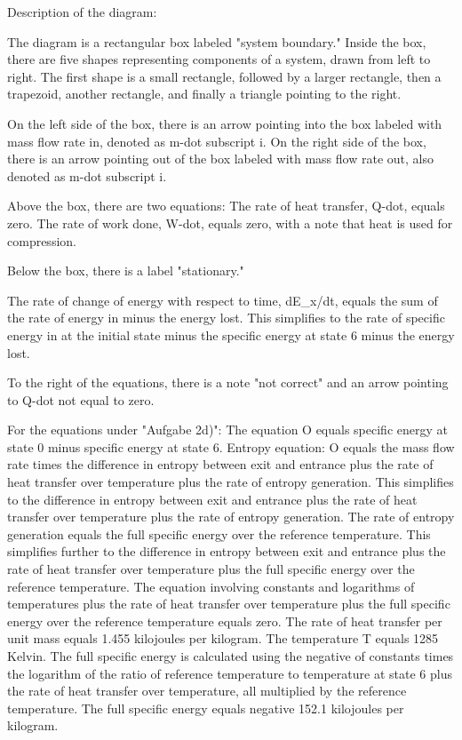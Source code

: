 Description of the diagram:

The diagram is a rectangular box labeled "system boundary." Inside the box, there are five shapes representing components of a system, drawn from left to right. The first shape is a small rectangle, followed by a larger rectangle, then a trapezoid, another rectangle, and finally a triangle pointing to the right.

On the left side of the box, there is an arrow pointing into the box labeled with mass flow rate in, denoted as m-dot subscript i. On the right side of the box, there is an arrow pointing out of the box labeled with mass flow rate out, also denoted as m-dot subscript i.

Above the box, there are two equations:
The rate of heat transfer, Q-dot, equals zero.
The rate of work done, W-dot, equals zero, with a note that heat is used for compression.

Below the box, there is a label "stationary."

The rate of change of energy with respect to time, dE_x/dt, equals the sum of the rate of energy in minus the energy lost.
This simplifies to the rate of specific energy in at the initial state minus the specific energy at state 6 minus the energy lost.

To the right of the equations, there is a note "not correct" and an arrow pointing to Q-dot not equal to zero.

For the equations under "Aufgabe 2d)":
The equation O equals specific energy at state 0 minus specific energy at state 6.
Entropy equation: O equals the mass flow rate times the difference in entropy between exit and entrance plus the rate of heat transfer over temperature plus the rate of entropy generation.
This simplifies to the difference in entropy between exit and entrance plus the rate of heat transfer over temperature plus the rate of entropy generation.
The rate of entropy generation equals the full specific energy over the reference temperature.
This simplifies further to the difference in entropy between exit and entrance plus the rate of heat transfer over temperature plus the full specific energy over the reference temperature.
The equation involving constants and logarithms of temperatures plus the rate of heat transfer over temperature plus the full specific energy over the reference temperature equals zero.
The rate of heat transfer per unit mass equals 1.455 kilojoules per kilogram.
The temperature T equals 1285 Kelvin.
The full specific energy is calculated using the negative of constants times the logarithm of the ratio of reference temperature to temperature at state 6 plus the rate of heat transfer over temperature, all multiplied by the reference temperature.
The full specific energy equals negative 152.1 kilojoules per kilogram.